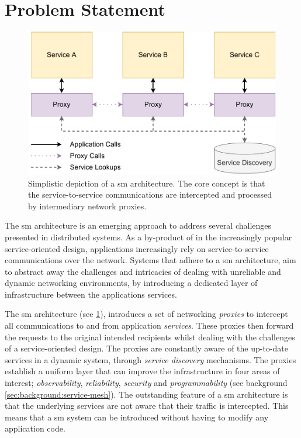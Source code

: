 \section{Problem Statement}
\label{sec:introduction:problem-statement}


\begin{figure}[!t]
    \centering
    
    \includegraphics[width=.8\linewidth]{1_introduction/figures/service-mesh-architecture-simple.pdf}

    \caption[Simplistic depiction of a \gls{sm} architecture]{Simplistic depiction of a \gls{sm} architecture. The core concept is that the service-to-service communications are intercepted and processed by intermediary network proxies.}
    \label{fig:service-mesh-architecture-simplified}
\end{figure}

The \gls{sm} architecture is an emerging approach to address several challenges presented in distributed systems. As a by-product of in the increasingly popular service-oriented design, applications increasingly rely on service-to-service communications over the network. Systems that adhere to a \gls{sm} architecture, aim to abstract away the challenges and intricacies of dealing with unreliable and dynamic networking environments, by introducing a dedicated layer of infrastructure between the applications services. 

The \gls{sm} architecture (see \cref{fig:service-mesh-architecture-simplified}), introduces a set of networking \textit{proxies} to intercept all communications to and from application \textit{services}. These proxies then forward the requests to the original intended recipients whilst dealing with the challenges of a service-oriented design. The proxies are constantly aware of the up-to-date services in a dynamic system, through \textit{service discovery} mechanisms. The proxies establish a uniform layer that can improve the infrastructure in four areas of interest; \textit{observability}, \textit{reliability}, \textit{security} and \textit{programmability} (see background \cref{sec:background:service-mesh}). The outstanding feature of a \gls{sm} architecture is that the underlying services are not aware that their traffic is intercepted. This means that a \gls{sm} system can be introduced without having to modify any application code.

